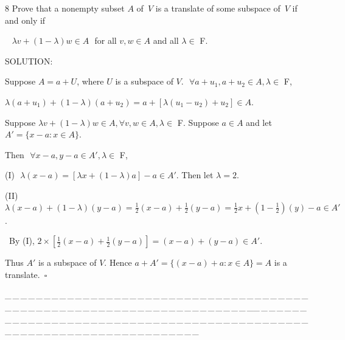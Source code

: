 \documentclass[a4paper, 11pt, UTF8]{article}
\begin{document}
\begin{large}
{\timesbf\Large 8} {\timessl\Large 
Prove that a nonempty subset $A$ of \,$V$ is a translate of some subspace of \,$V$ if and only if}\par\,\,\,
{\timessl\Large $\lambda v+(1-\lambda)w\in A\,\,$ for all $v,w\in A$ and all $\lambda\in$ {\timesbf F}.
}\par
{\timesbf S\footnotesize{OLUTION:}}\par\quad
Suppose $A=a+U$, where $U$ is a subspace of $V$. $\,\,\forall a+u_1,a+u_2\in A,\lambda\in$ {\timesbf F},\par\quad
$\lambda(a+u_1)+(1-\lambda)(a+u_2)=a+[\lambda(u_1-u_2)+u_2]\in A$.\par\quad
Suppose $\lambda v+(1-\lambda)w\in A,\forall v,w\in A,\lambda\in$ {\timesbf F}. Suppose $a\in A$ and let $A'=\{x-a:x\in A\}$.\par\quad
Then $\,\,\forall x-a,y-a\in A',\lambda\in$ {\timesbf F},\par\quad
(I) \,\,$\lambda(x-a)=[\lambda x+(1-\lambda)a]-a\in A'.$ Then let $\lambda=2$.\par\quad
(II) $\lambda(x-a)+(1-\lambda)(y-a)=\frac{1}{2}(x-a)+\frac{1}{2}(y-a)=\frac{1}{2}x+(1-\frac{1}{2})(y)-a\in A'$.\par\qquad\,
By (I), $2\times[\frac{1}{2}(x-a)+\frac{1}{2}(y-a)]=(x-a)+(y-a)\in A'$.\par\quad
Thus $A'$ is a subspace of $V$. Hence $a+A'=\{(x-a)+a:x\in A\}=A$ is a translate.$\,\,\,\square$\par
{\tiny \_\,\_\,\_\,\_\,\_\,\_\,\_\,\_\,\_\,\_\,\_\,\_\,\_\,\_\,\_\,\_\,\_\,\_\,\_\,\_\,\_\,\_\,\_\,\_\,\_\,\_\,\_\,\_\,\_\,\_\,\_\,\_\,\_\,\_\,\_\,\_\,\_\,\_\,\_\,\_\,\_\,\_\,\_\,\_\,\_\,\_\,\_\,\_\,\_\,\_\,\_\,\_\,\_\,\_\,\_\,\_\,\_\,\_\,\_\,\_\,\_\,\_\,\_\,\_\,\_\,\_\,\_\,\_\,\_\,\_\,\_\_\,\_\,\_\,\_\,\_\,\_\,\_\,\_\,\_\,\_\,\_\,\_\,\_\,\_\,\_\,\_\,\_\,\_\,\_\,\_\,\_\,\_\,\_\,\_\,\_\,\_\,\_\,\_\,\_\,\_\,\_\,\_\,\_\,\_\,\_\,\_\,\_\,\_\,\_\,\_\,\_\,\_\,\_\,\_\,\_\,\_\,\_\,\_\,\_\,\_\,\_\,\_\,\_\,\_\,\_\,\_\,\_\,\_\,\_\,\_\,\_\,\_\,\_\,\_\,\_\,\_\,\_\,\_\,\_\,\_\,\_}{\tiny\,\par}


\end{large}
\end{document}
